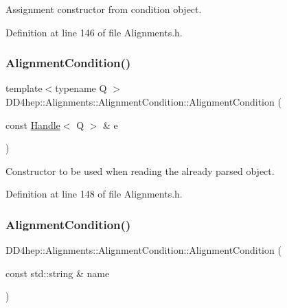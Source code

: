 Assignment constructor from condition object. 



Definition at line 146 of file Alignments.\+h.

\hypertarget{class_d_d4hep_1_1_alignments_1_1_alignment_condition_a3a03bae4c8409c63a94d0c2e1c5c1ed6}{}\label{class_d_d4hep_1_1_alignments_1_1_alignment_condition_a3a03bae4c8409c63a94d0c2e1c5c1ed6} 
\subsubsection{\texorpdfstring{Alignment\+Condition()}{AlignmentCondition()}\hspace{0.1cm}{\footnotesize\ttfamily [4/5]}}
{\footnotesize\ttfamily template$<$typename Q $>$ \\
D\+D4hep\+::\+Alignments\+::\+Alignment\+Condition\+::\+Alignment\+Condition (\begin{DoxyParamCaption}\item[{const \hyperlink{class_d_d4hep_1_1_handle}{Handle}$<$ Q $>$ \&}]{e }\end{DoxyParamCaption})\hspace{0.3cm}{\ttfamily [inline]}}



Constructor to be used when reading the already parsed object. 



Definition at line 148 of file Alignments.\+h.

\hypertarget{class_d_d4hep_1_1_alignments_1_1_alignment_condition_aac47c637a8b0c6f621e6c486244b21a2}{}\label{class_d_d4hep_1_1_alignments_1_1_alignment_condition_aac47c637a8b0c6f621e6c486244b21a2} 
\subsubsection{\texorpdfstring{Alignment\+Condition()}{AlignmentCondition()}\hspace{0.1cm}{\footnotesize\ttfamily [5/5]}}
{\footnotesize\ttfamily D\+D4hep\+::\+Alignments\+::\+Alignment\+Condition\+::\+Alignment\+Condition (\begin{DoxyParamCaption}\item[{const std\+::string \&}]{name }\end{DoxyParamCaption})}



